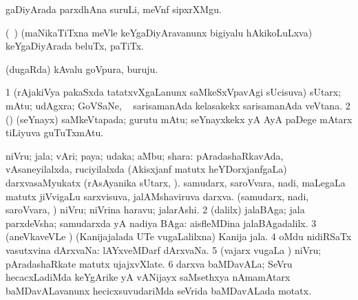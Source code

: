 \bentry
{} 
\gl{\nA}
\expl{}
\bmng
gaDiyArada parxdhAna suruLi, meVnf sipxrXMgu. 
\emng
\eentry

\bentry
{} 
\gl{\nA}
\expl{}
\bmng
(\kanmu\ \birx) (maNikaTiTxna meVle keYgaDiyAravanunx bigiyalu hAkikoLuLxva) keYgaDiyArada beluTx, paTiTx. 
\emng
\eentry

\bentry
{} 
\gl{\nA}
\expl{}
\bmng
(dugaRda) kAvalu goVpura, buruju. 
\emng
\eentry

\bentry
{} 
\gl{\nA}
\expl{}
\bmng
\bnum
\num{1} (rAjakiVya pakaSxda tatatxvXgaLanunx saMkeSxVpavAgi sUcisuva) sUtarx; mAtu; udAgxra; GoVSaNe, \udA\  sarisamanAda kelasakekx sarisamanAda veVtana. 
\num{2} (\ca) (seYnayx) saMkeVtapada; gurutu mAtu; seYnayxkekx yA AyA paDege mAtarx tiLiyuva guTuTxmAtu. 
\enum
\emng
\eentry

\bentry
{} 
\gl{\nA}
\expl{}
\bmng
\bnum
{} niVru; jala; vAri; paya; udaka; aMbu; shara: 
\banum
{} pAradashaRkavAda, vAsaneyilalxda, ruciyilalxda (Akisxjanf matutx heYDorxjanfgaLa) darxvasaMyukatx (rAsAyanika sUtarx, ). 
 samudarx, saroVvara, nadi, maLegaLa matutx jiVvigaLu sarxvisuva, jalAMshaviruva darxva. 
 (samudarx, nadi, saroVvara, \mo) niVru; niVrina haravu; jalarAshi. 
\eanum
\numie
\num{2} (\bava dalilx) jalaBAga; jala parxdeVsha; samudarxda yA nadiya BAga:  aisfleMDina jalaBAgadalilx. 
\num{3} (aneVkaveVLe ) (Kanijajalada UTe \mo vugaLalilxna) Kanija jala. 
\num{4} oMdu nidiRSaTx vasutxvina dArxvaNa:  lAYxveMDarf dArxvaNa. 
\num{5} (vajarx \mo vugaLa \vi) niVru; pAradashaRkate matutx ujajxvXlate. 
\num{6} darxva baMDavALa; SeVru hecacxLadiMda keYgArike yA vANijayx saMsethxya nAmamAtarx baMDavALavanunx hecicxsuvudariMda seVrida baMDavALada motatx. 
\enum
\emng

